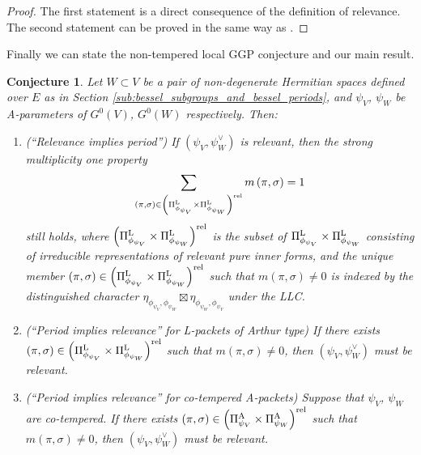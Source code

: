 \documentclass[11pt,letterpaper]{amsart}
\theoremstyle{plain}
\newcounter{theorem}[section]
\numberwithin{theorem}{section}
\numberwithin{equation}{subsection}
\newtheorem{Conj}[theorem]{Conjecture}
\theoremstyle{remark}
\def\LP{\Pi^{\rm L}} %
\def\AP{\Pi^{\rm A}} %
\def\rel{{\rm rel}} %
\begin{document}
\vskip 5pt

\begin{proof}
The first statement is a direct consequence of the definition of relevance. The second statement can be proved in the same way as \cite[Lem. 3.3]{chenchenNTGGP4ArchiGL}.

\end{proof}

\vskip 5pt

Finally we can state the non-tempered local GGP conjecture \cite[Conj. 6.1, 7.1]{MR4190046} and our main result.

\begin{Conj}\label{Conj:Non-temperedGGP}
Let $W\subset V$ be a pair of non-degenerate Hermitian spaces defined over $E$ as in Section \ref{sub:bessel_subgroups_and_bessel_periods}, and $\psi_V$, $\psi_W$ be A-parameters of $G^0\left(V\right)$, $G^0\left(W\right)$ respectively. Then:
\begin{enumerate}
       \item (``Relevance implies period'') If $\left(\psi_V,\psi_W^\vee\right)$ is relevant, then the strong multiplicity one property
\[
    \sum_{\left(\pi,\sigma\right)\in \left(\LP_{\phi_{\psi_V}}\times \LP_{\phi_{\psi_W}}\right)^\rel} m\left(\pi,\sigma\right)=1
\]
        still holds, where $\left(\LP_{\phi_{\psi_V}}\times \LP_{\phi_{\psi_W}}\right)^\rel$ is the subset of $\LP_{\phi_{\psi_V}}\times \LP_{\phi_{\psi_W}}$ consisting of irreducible representations of relevant pure inner forms, and the unique member $\left(\pi,\sigma\right)\in\left(\LP_{\phi_{\psi_V}}\times \LP_{\phi_{\psi_W}}\right)^\rel$ such that $m\left(\pi,\sigma\right)\neq 0$ is indexed by the distinguished character $\eta_{\phi_{\psi_V},\phi_{\psi_W}}\boxtimes\eta_{\phi_{\psi_W},\phi_{\psi_V}}$ under the LLC.

        \vskip 5pt

        \item (``Period implies relevance'' for L-packets of Arthur type) If there exists $\left(\pi,\sigma\right)\in\left(\LP_{\phi_{\psi_V}}\times \LP_{\phi_{\psi_W}}\right)^\rel$ such that $m\left(\pi,\sigma\right)\neq 0$, then $\left(\psi_V,\psi_W^\vee\right)$ must be relevant.

        \vskip 5pt

        \item (``Period implies relevance'' for co-tempered A-packets) Suppose that $\psi_V$, $\psi_W$ are co-tempered. If there exists $\left(\pi,\sigma\right)\in\left(\AP_{{\psi_V}}\times \AP_{{\psi_W}}\right)^\rel$ such that $m\left(\pi,\sigma\right)\neq 0$, then $\left(\psi_V,\psi_W^\vee\right)$ must be relevant.


\end{enumerate}
\end{Conj}
\end{document}
